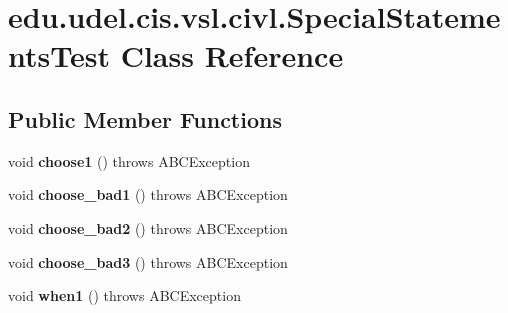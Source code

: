 \hypertarget{classedu_1_1udel_1_1cis_1_1vsl_1_1civl_1_1SpecialStatementsTest}{}\section{edu.\+udel.\+cis.\+vsl.\+civl.\+Special\+Statements\+Test Class Reference}
\label{classedu_1_1udel_1_1cis_1_1vsl_1_1civl_1_1SpecialStatementsTest}
\subsection*{Public Member Functions}
\begin{DoxyCompactItemize}
\item 
\hypertarget{classedu_1_1udel_1_1cis_1_1vsl_1_1civl_1_1SpecialStatementsTest_a5376671b1d30b8c24f8f9620bec1ebe1}{}void {\bfseries choose1} ()  throws A\+B\+C\+Exception \label{classedu_1_1udel_1_1cis_1_1vsl_1_1civl_1_1SpecialStatementsTest_a5376671b1d30b8c24f8f9620bec1ebe1}

\item 
\hypertarget{classedu_1_1udel_1_1cis_1_1vsl_1_1civl_1_1SpecialStatementsTest_ae9a47e0db5a1a476e6f88194ac718919}{}void {\bfseries choose\+\_\+bad1} ()  throws A\+B\+C\+Exception \label{classedu_1_1udel_1_1cis_1_1vsl_1_1civl_1_1SpecialStatementsTest_ae9a47e0db5a1a476e6f88194ac718919}

\item 
\hypertarget{classedu_1_1udel_1_1cis_1_1vsl_1_1civl_1_1SpecialStatementsTest_af9ab6be785895a9fe8c6dc782d27802d}{}void {\bfseries choose\+\_\+bad2} ()  throws A\+B\+C\+Exception \label{classedu_1_1udel_1_1cis_1_1vsl_1_1civl_1_1SpecialStatementsTest_af9ab6be785895a9fe8c6dc782d27802d}

\item 
\hypertarget{classedu_1_1udel_1_1cis_1_1vsl_1_1civl_1_1SpecialStatementsTest_a84a16032cd1a50243cfcc60e1baedf0d}{}void {\bfseries choose\+\_\+bad3} ()  throws A\+B\+C\+Exception \label{classedu_1_1udel_1_1cis_1_1vsl_1_1civl_1_1SpecialStatementsTest_a84a16032cd1a50243cfcc60e1baedf0d}

\item 
\hypertarget{classedu_1_1udel_1_1cis_1_1vsl_1_1civl_1_1SpecialStatementsTest_a156a5b5ff2a000218caf60a365ebea47}{}void {\bfseries when1} ()  throws A\+B\+C\+Exception \label{classedu_1_1udel_1_1cis_1_1vsl_1_1civl_1_1SpecialStatementsTest_a156a5b5ff2a000218caf60a365ebea47}


\end{DoxyCompactItemize}
